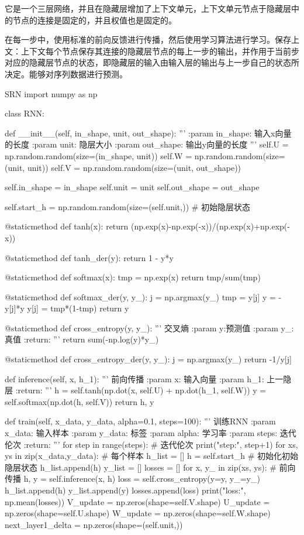 \documentclass[openbib]{article}
\begin{document}
它是一个三层网络，并且在隐藏层增加了上下文单元，上下文单元节点于隐藏层中的节点的连接是固定的，并且权值也是固定的。

在每一步中，使用标准的前向反馈进行传播，然后使用学习算法进行学习。保存上文：上下文每个节点保存其连接的隐藏层节点的每上一步的输出，并作用于当前步对应的隐藏层节点的状态，即隐藏层的输入由输入层的输出与上一步自己的状态所决定。能够对序列数据进行预测。
\begin{Python}{SRN}
	import numpy as np
	
	
	class RNN:
	
	def __init__(self, in_shape, unit, out_shape):
	'''
	:param in_shape: 输入x向量的长度
	:param unit: 隐层大小
	:param out_shape: 输出y向量的长度
	'''
	self.U = np.random.random(size=(in_shape, unit))
	self.W = np.random.random(size=(unit, unit))
	self.V = np.random.random(size=(unit, out_shape))
	
	self.in_shape = in_shape
	self.unit = unit
	self.out_shape = out_shape
	
	self.start_h = np.random.random(size=(self.unit,))  # 初始隐层状态
	
	@staticmethod
	def tanh(x):
	return (np.exp(x)-np.exp(-x))/(np.exp(x)+np.exp(-x))
	
	@staticmethod
	def tanh_der(y):
	return 1 - y*y
	
	@staticmethod
	def softmax(x):
	tmp = np.exp(x)
	return tmp/sum(tmp)
	
	@staticmethod
	def softmax_der(y, y_):
	j = np.argmax(y_)
	tmp = y[j]
	y = -y[j]*y
	y[j] = tmp*(1-tmp)
	return y
	
	@staticmethod
	def cross_entropy(y, y_):
	'''
	交叉熵
	:param y:预测值
	:param y_: 真值
	:return:
	'''
	return sum(-np.log(y)*y_)
	
	@staticmethod
	def cross_entropy_der(y, y_):
	j = np.argmax(y_)
	return -1/y[j]
	
	def inference(self, x, h_1):
	'''
	前向传播
	:param x: 输入向量
	:param h_1: 上一隐层
	:return:
	'''
	h = self.tanh(np.dot(x, self.U) + np.dot(h_1, self.W))
	y = self.softmax(np.dot(h, self.V))
	return h, y
	
	def train(self, x_data, y_data, alpha=0.1, steps=100):
	'''
	训练RNN
	:param x_data: 输入样本
	:param y_data: 标签
	:param alpha: 学习率
	:param steps: 迭代伦次
	:return:
	'''
	for step in range(steps):  # 迭代伦次
	print("step:", step+1)
	for xs, ys in zip(x_data,y_data):  # 每个样本
	h_list = []
	h = self.start_h  # 初始化初始隐层状态
	h_list.append(h)
	y_list = []
	losses = []
	for x, y_ in zip(xs, ys):  # 前向传播
	h, y = self.inference(x, h)
	loss = self.cross_entropy(y=y, y_=y_)
	h_list.append(h)
	y_list.append(y)
	losses.append(loss)
	print("loss:", np.mean(losses))
	V_update = np.zeros(shape=self.V.shape)
	U_update = np.zeros(shape=self.U.shape)
	W_update = np.zeros(shape=self.W.shape)
	next_layer1_delta = np.zeros(shape=(self.unit,))
	

\end{Python}
\end{document}
